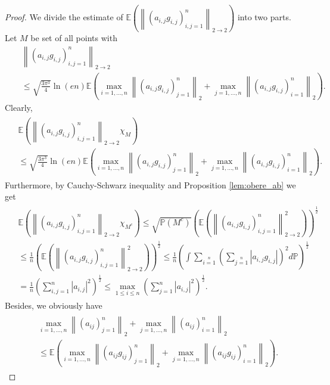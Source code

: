 \documentclass[12pt,a4paper]{article}
\newcommand{\Pv}{\mathbb{P}}
\newcommand{\Ex}{\mathbb{E}}
\newcommand{\norm}[1]{\left \lVert#1 \right\rVert}
\begin{document}
\begin{proof}  We divide the estimate of $\Ex\left(\norm{(a_{i,j}g_{i,j})_{i,j=1}^n}_{2\rightarrow 2}\right)$ into two parts.  Let $M$ be set of all points with
	\begin{eqnarray*}
	&&\norm{(a_{i,j}g_{i,j})_{i,j=1}^n}_{2\rightarrow 2}  \\
	&&\leq\sqrt{\frac{3\pi^{3}}{4}}\ln(en)
	\Ex\left(\max\limits_{i=1,...,n}\norm{(a_{i,j}g_{i,j})_{j=1}^n}_2+
	\max\limits_{j=1,...,n}\norm{(a_{i,j}g_{i,j})_{i=1}^n}_2\right).
	\end{eqnarray*}
Clearly,
\begin{eqnarray*}
	\left.\begin{split}
	&\Ex\left(\norm{(a_{i,j}g_{i,j})_{i,j=1}^n}_{2\rightarrow 2}\chi_M\right) \\
	&\leq\sqrt{\frac{3\pi^{3}}{4}}\ln(en)
	\Ex\left(\max\limits_{i=1,...,n}\norm{(a_{i,j}g_{i,j})_{j=1}^n}_2
	+\max\limits_{j=1,...,n}\norm{(a_{i,j}g_{i,j})_{i=1}^n}_2\right).
	\end{split}\right.
\end{eqnarray*}
Furthermore, by Cauchy-Schwarz inequality and Proposition \ref{lem:obere_ab} we get
\begin{eqnarray*}
	\left.\begin{split}
     & \Ex\left(\norm{(a_{i,j}g_{i,j})_{i,j=1}^n}_{2\rightarrow 2}\chi_{M^{c}}\right)
	\leq \sqrt{\Pv\left(M^{c}\right)}\left(\Ex\left(\norm{(a_{i,j}g_{i,j})_{i,j=1}^n}^2_{2\rightarrow 2}\right)\right)^{\frac{1}{2}}
	\\
	& \leq \frac{1}{n}\left(\Ex\left(\norm{(a_{i,j}g_{i,j})_{i,j=1}^n}^2_{2\rightarrow 2}\right)\right)^{\frac{1}{2}}
	\leq \frac{1}{n}\left(\int\sum\limits_{i=1}\limits^n\left(\sum\limits_{j=1}\limits^n|a_{i,j}g_{i,j}|\right)^2d\Pv\right)^{\frac{1}{2}}  \\
	&=\frac{1}{n}\left(\sum_{i,j=1}^{n}|a_{i,j}|^{2}\right)^{\frac{1}{2}}
	\leq\max_{1\leq i\leq n}\left(\sum_{j=1}^{n}|a_{i,j}|^{2}\right)^{\frac{1}{2}}.
	\end{split}\right.  
\end{eqnarray*}
Besides, we obviously have
\begin{eqnarray*}
\begin{split}
&\max\limits_{i=1,...,n}\norm{(a_{ij})_{j=1}^n}_2+\max\limits_{j=1,...,n}\norm{(a_{ij})_{i=1}^n}_2  \\
&\leq \Ex\left(\max\limits_{i=1,...,n}\norm{(a_{ij}g_{ij})_{j=1}^n}_2+\max\limits_{j=1,...,n}\norm{(a_{ij}g_{ij})_{i=1}^n}_2\right).
\end{split}

\end{eqnarray*}
\end{proof}
\end{document}
